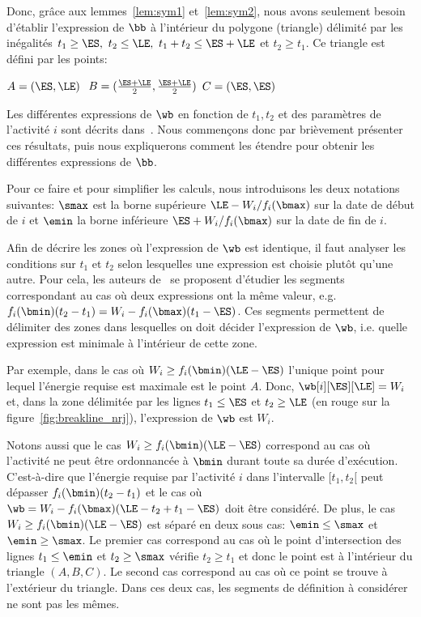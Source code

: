 Donc, grâce aux lemmes~\ref{lem:sym1} et~\ref{lem:sym2}, nous avons
seulement besoin d'établir l'expression de $\bb$ à l'intérieur du
polygone (triangle) délimité par les inégalités $t_1 \ge \ES, \ t_2
\le \LE,\ t_1+t_2 \le \ES+\LE$ et $ t_2 \ge t_1$. Ce triangle est
défini par les points:

$A=(\ES,\LE)$ \hfill $\ B=(\frac{\ES+\LE}{2},\frac{\ES+\LE}{2})$
\hfill $C=( \ES,\ES)$

Les différentes expressions de $\wb$ en fonction de $t_1,t_2$ et des
paramètres de l'activité $i$ sont décrits
dans~\cite{ArtiguesLopez}. Nous commençons donc par brièvement
présenter ces résultats, puis nous expliquerons comment les étendre
pour obtenir les différentes expressions de $\bb$.

Pour ce faire et pour simplifier les calculs, nous introduisons les
deux notations suivantes: $\smax$ est la borne supérieure $ \LE -
W_i/f_i(\bmax)$ sur la date de début de $i$ et $\emin$ la borne
inférieure $\ES + W_i/f_i(\bmax)$ sur la date de fin de $i$. 

Afin de décrire les zones où l'expression de $\wb$ est identique, il
faut analyser les conditions sur $t_1$ et $t_2$ selon lesquelles une
expression est choisie plutôt qu'une autre. Pour cela, les auteurs
de~\cite{ArtiguesLopez} se proposent d'étudier les segments
correspondant au cas où deux expressions ont la même valeur,
e.g. $f_i(\bmin)(t_2-t_1) = W_i - f_i(\bmax) (t_1-\ES)$. Ces segments
permettent de délimiter des zones dans lesquelles on doit décider
l'expression de $\wb$, i.e. quelle expression est minimale à
l'intérieur de cette zone. 

Par exemple, dans le cas où $W_i \ge f_i(\bmin)(\LE -\ES)$ l'unique
point pour lequel l'énergie requise est maximale est le point
$A$. Donc, $\wb[i][\ES][\LE]= W_i$ et, dans la zone délimitée par les
lignes $t_1 \le \ES$ et $t_2 \ge \LE$ (en rouge sur la
figure~\ref{fig:breakline_nrj}), l'expression de $\wb$ est $W_i$. 

Notons aussi que le cas $W_i \ge f_i(\bmin)(\LE -\ES)$ correspond au
cas où l'activité ne peut être ordonnancée à $\bmin$ durant toute sa
durée d'exécution. C'est-à-dire que l'énergie requise par l'activité
$i$ dans l'intervalle $[t_1,t_2[$ peut dépasser $f_i(\bmin)(t_2-t_1)$
et le cas où $\wb= W_i - f_i(\bmax)(\LE-t_2+t_1-\ES)$ doit être
considéré. De plus, le cas $W_i \ge f_i(\bmin)(\LE -\ES)$ est
séparé en deux sous cas: $\emin \le \smax$ et $\emin \ge \smax$. Le
premier cas correspond au cas où le point d'intersection des lignes
$t_1\le \emin$ et $t_2 \ge \smax$ vérifie $t_2 \ge t_1$ et donc le
point est à l'intérieur du triangle $(A,B,C)$. Le second cas
correspond au cas où ce point se trouve à l'extérieur du
triangle. Dans ces deux cas, les segments de définition à considérer
ne sont pas les mêmes.

